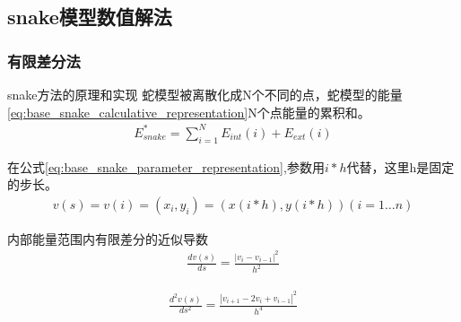 \subsection{snake模型数值解法}
\subsubsection{有限差分法}
snake方法的原理和实现
蛇模型被离散化成N个不同的点，蛇模型的能量\eqref{eq:base_snake_calculative_representation}N个点能量的累积和。
\begin{align}\label{eq:snake_energy_discrete_representation}
E_{snake}^{*} = \sum_{i=1}^{N}E_{int}(i)+E_{ext}(i)
\end{align}

在公式\eqref{eq:base_snake_parameter_representation},参数用$i*h$代替，这里h是固定的步长。
\begin{align}\label{eq:snake_parameter_discrete_representation}
v(s)=v(i)=(x_{i},y_{i})=(x(i*h),y(i*h)) (i=1 \ldots n)
\end{align}

内部能量范围内有限差分的近似导数
\begin{align}\label{eq:simple_parameter_derivative_first_order}
\frac{dv(s)}{ds} = \frac{|v_{i}-v_{i-1}|^{2}}{h^{2}}
\end{align}

\begin{align}\label{eq:simple_parameter_derivative_second_order}
\frac{d^{2}v(s)}{ds^{2}} = \frac{|v_{i+1}-2v_{i}+v_{i-1}|^{2}}{h^{4}}
\end{align}

